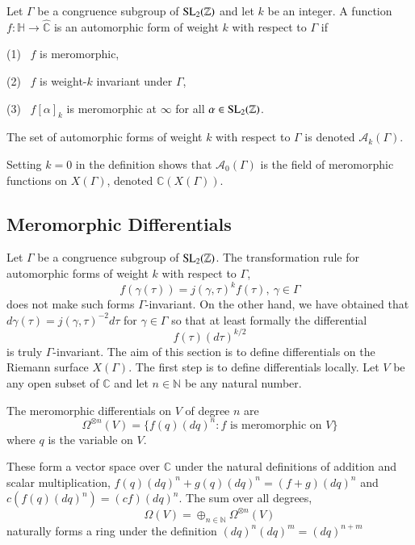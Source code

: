 \begin{definition}
    Let $\Gamma$ be a congruence subgroup of ${\rm SL_2}(\mathbb{Z})$ and let $k$ be an integer. A function 
    $f:\mathbb{H}\rightarrow\hat{\mathbb{C}}$ is an automorphic form of weight $k$ with respect to $\Gamma$ 
    if \par
    (1) \ $f$ is meromorphic,\par
    (2) \ $f$ is weight-$k$ invariant under $\Gamma$,\par
    (3) \ $f[\alpha]_k$ is meromorphic at $\infty$ for all $\alpha\in {\rm SL_2}(\mathbb{Z})$. \par
    The set of automorphic forms of weight $k$ with respect to $\Gamma$ is denoted $\mathcal{A}_k(\Gamma)$.
\end{definition}

Setting $k=0$ in the definition shows that $\mathcal{A}_0(\Gamma)$ is the field of meromorphic functions on 
$X(\Gamma)$, denoted $\mathbb{C}(X(\Gamma))$.

\subsection{Meromorphic Differentials}
Let $\Gamma$ be a congruence subgroup of ${\rm SL_2}(\mathbb{Z})$. The transformation rule for automorphic 
forms of weight $k$ with respect to $\Gamma$, 
\begin{equation*}
    f(\gamma(\tau))=j(\gamma,\tau)^k f(\tau), \ \gamma\in \Gamma
\end{equation*}
does not make such forms $\Gamma$-invariant. On the other hand, we have obtained that $d\gamma(\tau)=j(\gamma,\tau)^{-2} d\tau$
for $\gamma\in \Gamma$ so that at least formally the differential 
\begin{equation*}
    f(\tau)(d\tau)^{k/2}
\end{equation*} 
is truly $\Gamma$-invariant. The aim of this section is to define differentials on the Riemann surface $X(\Gamma)$. 
The first step is to define differentials locally. Let $V$ be any open subset of $\mathbb{C}$ and let $n\in\mathbb{N}$
be any natural number.
\begin{definition}
    The meromorphic differentials on $V$ of degree $n$ are 
    \begin{equation*}
        \Omega ^{\otimes n}(V)=\{f(q)(dq)^n:f \text{ is meromorphic on } V\}
    \end{equation*}
    where $q$ is the variable on $V$.
\end{definition} 
These form a vector space over $\mathbb{C}$ under the natural definitions of addition and scalar multiplication, 
$f(q)(dq)^n+g(q)(dq)^n=(f+g)(dq)^n$ and $c(f(q)(dq)^n)=(cf)(dq)^n$. The sum over all degrees, 
\begin{equation*}
    \Omega(V)=\oplus_{n\in\mathbb{N}}\Omega^{\otimes n}(V)
\end{equation*}
naturally forms a ring under the definition $(dq)^n(dq)^m=(dq)^{n+m}$

